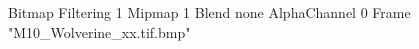 {Bitmap
	{Filtering 1}
	{Mipmap 1}
	{Blend none}
	{AlphaChannel 0}
	{Frame "M10_Wolverine_xx.tif.bmp"}
}
